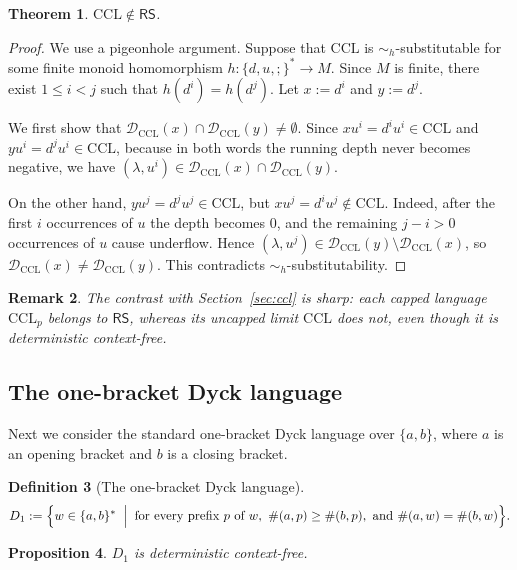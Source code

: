 \documentclass[11pt,a4paper]{article}
\newtheorem{theorem}{Theorem}[section]
\newtheorem{proposition}[theorem]{Proposition}
\newtheorem{definition}[theorem]{Definition}
\newtheorem{remark}[theorem]{Remark}
\newcommand{\D}{\mathcal{D}}
\begin{document}
\begin{theorem}\label{thm:ccl-not-rs}
$\mathrm{CCL}\notin\mathsf{RS}$.
\end{theorem}

\begin{proof}
We use a pigeonhole argument. Suppose that $\mathrm{CCL}$ is $\sim_h$-substitutable for some finite monoid homomorphism $h:\{d,u,;\}^*\to M$. Since $M$ is finite, there exist $1\le i<j$ such that $h(d^i)=h(d^j)$. Let $x:=d^i$ and $y:=d^j$.

We first show that $\D_{\mathrm{CCL}}(x)\cap\D_{\mathrm{CCL}}(y)\neq\emptyset$. Since $xu^i=d^iu^i\in\mathrm{CCL}$ and $yu^i=d^ju^i\in\mathrm{CCL}$, because in both words the running depth never becomes negative, we have $(\lambda,u^i)\in\D_{\mathrm{CCL}}(x)\cap\D_{\mathrm{CCL}}(y)$.

On the other hand, $yu^j=d^ju^j\in\mathrm{CCL}$, but $xu^j=d^iu^j\notin\mathrm{CCL}$. Indeed, after the first $i$ occurrences of $u$ the depth becomes $0$, and the remaining $j-i>0$ occurrences of $u$ cause underflow. Hence $(\lambda,u^j)\in\D_{\mathrm{CCL}}(y)\setminus\D_{\mathrm{CCL}}(x)$, so $\D_{\mathrm{CCL}}(x)\ne\D_{\mathrm{CCL}}(y)$. This contradicts $\sim_h$-substitutability.
\end{proof}

\begin{remark}
The contrast with Section~\ref{sec:ccl} is sharp: each capped language $\mathrm{CCL}_p$ belongs to $\mathsf{RS}$, whereas its uncapped limit $\mathrm{CCL}$ does not, even though it is deterministic context-free.
\end{remark}




\subsection{The one-bracket Dyck language}
\label{ssec:dyck1}

Next we consider the standard one-bracket Dyck language over $\{a,b\}$, where $a$ is an opening bracket and $b$ is a closing bracket.

\begin{definition}[The one-bracket Dyck language]\label{def:dyck1}
\[
D_1
:=\Bigl\{
w\in\{a,b\}^*
\;\Bigm|\;
\text{for every prefix } p \text{ of } w,\ \#(a,p)\ge \#(b,p),
\text{ and } \#(a,w)=\#(b,w)
\Bigr\}.
\]
\end{definition}

\begin{proposition}\label{prop:dyck1-dcfl}
$D_1$ is deterministic context-free.
\end{proposition}
\end{document}
